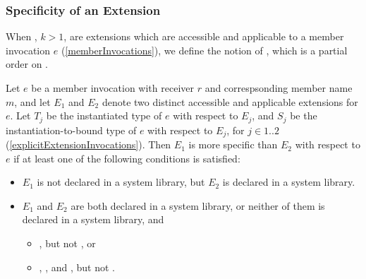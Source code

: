 \documentclass[makeidx]{article}
\begin{document}


\subsubsection{Specificity of an Extension}

\LMHash{}%
%
When , $k > 1$, are extensions
which are accessible and applicable to a member invocation $e$
(\ref{memberInvocations}),
we define the notion of
,
which is a partial order on .


\LMHash{}%
%
Let $e$ be a member invocation with receiver $r$
and correspsonding member name $m$,
%
and let $E_1$ and $E_2$ denote two distinct
accessible and applicable extensions for $e$.
%
Let $T_j$ be the instantiated \ON{} type of $e$ with respect to $E_j$,
and $S_j$ be the instantiation-to-bound \ON{} type of $e$ with respect to $E_j$,
for $j \in 1 .. 2$
(\ref{explicitExtensionInvocations}).
Then $E_1$ is more specific than $E_2$ with respect to $e$
if at least one of the following conditions is satisfied:

\begin{itemize}
\item
  $E_1$ is not declared in a system library,
  but $E_2$ is declared in a system library.
\item
  $E_1$ and $E_2$ are both declared in a system library,
  or neither of them is declared in a system library, and
  \begin{itemize}
  \item {}, but not , or
  \item {}, , and
    , but not .
  \end{itemize}

\end{itemize}
\end{document}
